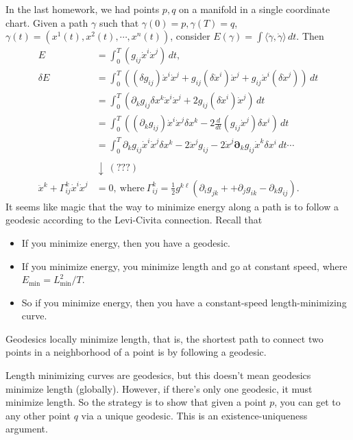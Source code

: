     In the last homework, we had points $p,q$ on a manifold in a single coordinate chart. Given a path $\gamma $ such that $\gamma (0)=p,\gamma (T)=q$, $\gamma (t)=(x^1(t),x^2(t),\cdots ,x^n (t))$, consider $E(\gamma )= \int \langle \dot \gamma ,\dot \gamma  \rangle  \, dt$. Then 
    \begin{align*}
        E&=\int_{0}^{T} (g_{ij}\dot x^i \dot x^j ) \, dt,\\
        \delta E&=\int_{0}^{T} ((\delta g_{ij})\dot x^i \dot x^j +g_{ij}(\delta \dot x^i )\dot x^j +g_{ij}\dot x^i (\delta \dot x^j ) )\, dt\\
                &=\int_{0}^{T} (\partial _k g_{ij}\delta x^k \dot x^i \dot x^j +2g_{ij}(\delta \dot x^i )\dot x^j )\, dt\\
                &=\int_{0}^{T}( (\partial _k g_{ij})\dot x^i \dot x^j \delta x^k-2 \frac{d}{dt}(g_{ij}\dot x^j )\delta x^i ) \, dt\\
                &=\int_{0}^{T} \partial _k g_{ij}\dot x^i \dot x^j \delta x^k-2\ddot x^j g_{ij}-2\dot x^j \mathbf \partial _k g_{ij}\dot x^k \delta x^i  \, dt \cdots \\
             \\ &\downarrow\ (???) \ \\
        \ddot x^k + \Gamma _{ij}^k\dot x^i\dot x^j &=0, \ \text{where} \ \Gamma _{ij}^k=\frac{1}{2}g^{k\ell}(\partial _i g_{jk}++\partial _j g_{ik}-\partial _kg_{ij}).
    \end{align*}
    It seems like magic that the way to minimize energy along a path is to follow a geodesic according to the Levi-Civita connection. Recall that
    \begin{itemize}
    \setlength\itemsep{-.2em}
        \item If you minimize energy, then you have a geodesic.
        \item If you minimize energy, you minimize length and go at constant speed, where $E_{\text{min} }=L_{\text{min} }^2/T$.
        \item So if you minimize energy, then you have a constant-speed length-minimizing curve.
    \end{itemize}
    \begin{theorem}
    Geodesics locally minimize length, that is, the shortest path to connect two points in a neighborhood of a point is by following a geodesic.    
\end{theorem}Length minimizing curves are geodesics, but this doesn't mean geodesics minimize length (globally). However, if there's only one geodesic, it must minimize length. So the strategy is to show that given a point $p$, you can get to any other point $q$ via a unique geodesic. This is an existence-uniqueness argument.
